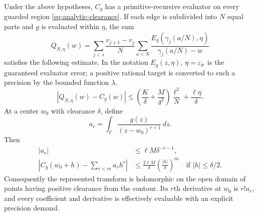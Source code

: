 \begin{theorem}
\label{thm:analytic-cauchy-transform}
Under the above hypotheses, $C_g$ has a primitive-recursive evaluator on every guarded region \eqref{eq:analytic-clearance}.  If each edge is subdivided into $N$ equal parts and $g$ is evaluated within $\eta$, the sum
\[
 Q_{N,\eta}(w)=\sum_{j<s}\frac{v_{j+1}-v_j}{N}
      \sum_{a<N}\frac{E_g(\gamma_j(a/N),\eta)}{\gamma_j(a/N)-w}
\]
satisfies the following estimate.  In the notation $E_g(z,\eta)$, $\eta=\varepsilon_p$ is the guaranteed evaluator error; a positive rational target is converted to such a precision by the bounded function $\lambda$.
\begin{equation}
 |Q_{N,\eta}(w)-C_g(w)|
 \le\left(\frac K\delta+\frac M{\delta^2}\right)
             \frac{\ell^2}{N}+\frac{\ell\eta}{\delta}.
 \label{eq:analytic-cauchy-quadrature}
\end{equation}
At a center $w_0$ with clearance $\delta$, define
\[
 a_r=\int_\Gamma\frac{g(z)}{(z-w_0)^{r+1}}\,dz.
\]
Then
\begin{align}
 |a_r|&\le\ell M\delta^{-r-1},\label{eq:analytic-cauchy-coeff}\\
 \left|C_g(w_0+h)-\sum_{r<m}a_rh^r\right|
 &\le\frac{2\ell M}{\delta}
             \left(\frac{|h|}{\delta}\right)^m
       \quad\text{if }|h|\le\delta/2.\label{eq:analytic-cauchy-taylor}
\end{align}
Consequently the represented transform is holomorphic on the open domain of points having positive clearance from the contour.  Its $r$th derivative at $w_0$ is $r!a_r$, and every coefficient and derivative is effectively evaluable with an explicit precision demand.
\end{theorem}

